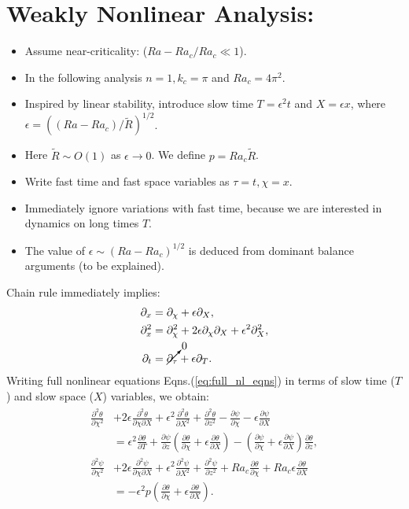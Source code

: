 \documentclass{article}
\newcommand{\pd}[2]{\frac{\partial{#1}}{\partial{#2}}}
\newcommand{\pdd}[2]{\frac{\partial^2{#1}}{\partial{#2}^2}}
\newcommand{\pddmixed}[3]{\frac{\partial^2{#1}}{\partial{#2}\partial{#3}}}
\begin{document}
\section{Weakly Nonlinear Analysis:}
\begin{itemize}
 \item Assume near-criticality: ($Ra-Ra_{c}/Ra_{c} \ll 1$).
 \item In the following analysis $n = 1, k_{c} = \pi$ and $Ra_{c} = 4\pi^{2}$.
 \item Inspired by linear stability, introduce slow time $T = \epsilon^{2}t$ and $X = \epsilon x$, where $\epsilon = \left((Ra-Ra_{c})/\tilde{R}\right)^{1/2}$.
 \item Here $\tilde{R} \sim O(1)$ as $\epsilon \rightarrow 0$. We define $p = Ra_{c} \tilde{R}$. 
 \item Write fast time and fast space variables as $\tau = t, \chi = x$. 
 \item Immediately ignore variations with fast time, because we are interested in dynamics on long times $T$.
 \item The value of $\epsilon \sim (Ra-Ra_{c})^{1/2}$ is deduced from dominant balance arguments (to be explained).
\end{itemize}
%
Chain rule immediately implies:
\begin{align}\label{eq:chain_rule}
 \begin{split}
  \partial_{x} & = \partial_{\chi} + \epsilon \partial_{X}, \\
  \partial^{2}_{x} & = \partial^{2}_{\chi} + 2 \epsilon \partial_{\chi} \partial_{X} + \epsilon^{2} \partial^{2}_{X}, \\
  \partial_{t} & = \cancelto{0}{\partial_{\tau}} + \epsilon \partial_{T}. \\
 \end{split}
\end{align}
%
Writing full nonlinear equations Eqns.(\ref{eq:full_nl_eqns}) in terms of slow time ($T$) and slow space ($X$) variables, we obtain:
\begin{align}
 \begin{split}
  \pdd{\theta}{\chi} & + 2\epsilon \pddmixed{\theta}{\chi}{X} + \epsilon^{2}\pdd{\theta}{X} + \pdd{\theta}{z} - \pd{\psi}{\chi} - \epsilon \pd{\psi}{X} \\
  & = \epsilon^{2} \pd{\theta}{T} + \pd{\psi}{z}\left(\pd{\theta}{\chi} + \epsilon \pd{\theta}{X} \right) - \left( \pd{\psi}{\chi} + \epsilon \pd{\psi}{X}\right)\pd{\theta}{z},\\
  \pdd{\psi}{\chi} & + 2\epsilon\pddmixed{\psi}{\chi}{X} + \epsilon^{2} \pdd{\psi}{X} + \pdd{\psi}{z} + Ra_{c} \pd{\theta}{\chi} + Ra_{c}\epsilon\pd{\theta}{X} \\
  &= -\epsilon^{2} p \left(\pd{\theta}{\chi} + \epsilon \pd{\theta}{X} \right).
 \end{split}
\end{align}
\end{document}
